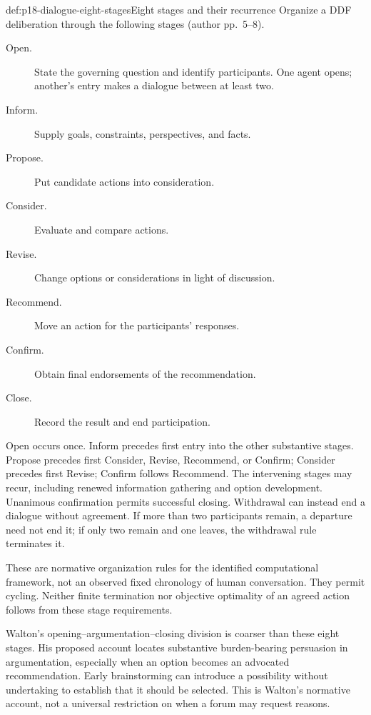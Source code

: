 \begin{hbmethod}{def:p18-dialogue-eight-stages}{Eight stages and their recurrence}
Organize a DDF deliberation through the following stages
(author pp.~5--8).
\begin{description}
\item[Open.] State the governing question and identify participants.
One agent opens; another's entry makes a dialogue between at least two.
\item[Inform.] Supply goals, constraints, perspectives, and facts.
\item[Propose.] Put candidate actions into consideration.
\item[Consider.] Evaluate and compare actions.
\item[Revise.] Change options or considerations in light of discussion.
\item[Recommend.] Move an action for the participants' responses.
\item[Confirm.] Obtain final endorsements of the recommendation.
\item[Close.] Record the result and end participation.
\end{description}
Open occurs once. Inform precedes first entry into the other substantive
stages. Propose precedes first Consider, Revise, Recommend, or Confirm;
Consider precedes first Revise; Confirm follows Recommend.
The intervening stages may recur, including renewed information gathering
and option development. Unanimous confirmation permits successful
closing. Withdrawal can instead end a dialogue without agreement.
If more than two participants remain, a departure need not end it;
if only two remain and one leaves, the withdrawal rule terminates it.

These are normative organization rules for the identified computational
framework, not an observed fixed chronology of human conversation.
They permit cycling. Neither finite termination nor objective optimality
of an agreed action follows from these stage requirements.
\end{hbmethod}

Walton's opening--argumentation--closing division is coarser than these
eight stages. His proposed account locates substantive burden-bearing
persuasion in argumentation, especially when an option becomes an
advocated recommendation. Early brainstorming can introduce a possibility
without undertaking to establish that it should be selected.
This is Walton's normative account, not a universal restriction on
when a forum may request reasons.

